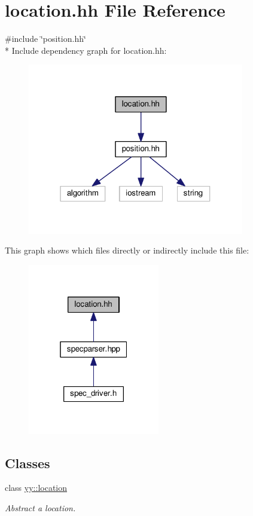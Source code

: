 \hypertarget{location_8hh}{}\section{location.\+hh File Reference}
\label{location_8hh}
{\ttfamily \#include \char`\"{}position.\+hh\char`\"{}}\\*
Include dependency graph for location.\+hh\+:\nopagebreak
\begin{figure}[H]
\begin{center}
\leavevmode
\includegraphics[width=268pt]{location_8hh__incl}
\end{center}
\end{figure}
This graph shows which files directly or indirectly include this file\+:\nopagebreak
\begin{figure}[H]
\begin{center}
\leavevmode
\includegraphics[width=163pt]{location_8hh__dep__incl}
\end{center}
\end{figure}
\subsection*{Classes}
\begin{DoxyCompactItemize}
\item 
class \hyperlink{classyy_1_1location}{yy\+::location}
\begin{DoxyCompactList}\small\item\em Abstract a location. \end{DoxyCompactList}\end{DoxyCompactItemize}
